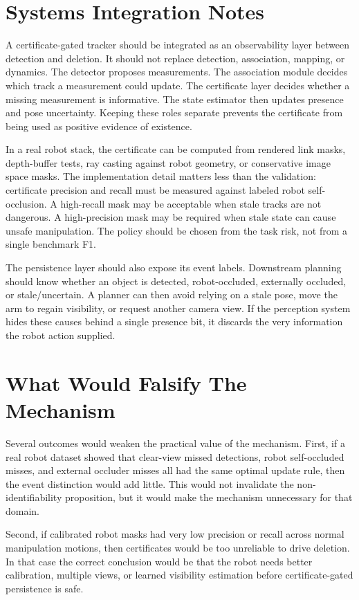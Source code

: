 \documentclass{article}
\begin{document}
\section{Systems Integration Notes}

A certificate-gated tracker should be integrated as an observability layer
between detection and deletion. It should not replace detection, association,
mapping, or dynamics. The detector proposes measurements. The association
module decides which track a measurement could update. The certificate layer
decides whether a missing measurement is informative. The state estimator then
updates presence and pose uncertainty. Keeping these roles separate prevents
the certificate from being used as positive evidence of existence.

In a real robot stack, the certificate can be computed from rendered link masks,
depth-buffer tests, ray casting against robot geometry, or conservative image
space masks. The implementation detail matters less than the validation:
certificate precision and recall must be measured against labeled robot
self-occlusion. A high-recall mask may be acceptable when stale tracks are not
dangerous. A high-precision mask may be required when stale state can cause
unsafe manipulation. The policy should be chosen from the task risk, not from a
single benchmark F1.

The persistence layer should also expose its event labels. Downstream planning
should know whether an object is detected, robot-occluded, externally occluded,
or stale/uncertain. A planner can then avoid relying on a stale pose, move the
arm to regain visibility, or request another camera view. If the perception
system hides these causes behind a single presence bit, it discards the very
information the robot action supplied.

\section{What Would Falsify The Mechanism}

Several outcomes would weaken the practical value of the mechanism. First, if a
real robot dataset showed that clear-view missed detections, robot self-occluded
misses, and external occluder misses all had the same optimal update rule, then
the event distinction would add little. This would not invalidate the
non-identifiability proposition, but it would make the mechanism unnecessary for
that domain.

Second, if calibrated robot masks had very low precision or recall across normal
manipulation motions, then certificates would be too unreliable to drive
deletion. In that case the correct conclusion would be that the robot needs
better calibration, multiple views, or learned visibility estimation before
certificate-gated persistence is safe.
\end{document}
